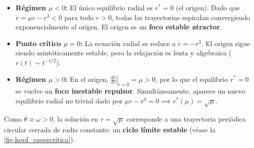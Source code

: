 \begin{itemize}
    \item \textbf{Régimen $\mu < 0$:} El único equilibrio radial es $r^* = 0$ (el origen). Dado que $\dot{r} = \mu r - r^3 < 0$ para todo $r > 0$, todas las trayectorias espiralan convergiendo exponencialmente al origen. El origen es un \textbf{foco estable atractor}.
    
    \item \textbf{Punto crítico $\mu = 0$:} La ecuación radial se reduce a $\dot{r} = -r^3$. El origen sigue siendo asintóticamente estable, pero la relajación es lenta y algebraica ($r(t) \sim t^{-1/2}$).
    
    \item \textbf{Régimen $\mu > 0$:} En el origen, $\left.\frac{d\dot{r}}{dr}\right|_{r=0} = \mu > 0$, por lo que el equilibrio $r^* = 0$ se vuelve un \textbf{foco inestable repulsor}. Simultáneamente, aparece un nuevo equilibrio radial no trivial dado por $\mu r - r^3 = 0 \implies r^*(\mu) = \sqrt{\mu}$.
\end{itemize}

Como $\dot{\theta} \approx \omega > 0$, la solución en $r = \sqrt{\mu}$ corresponde a una trayectoria periódica circular cerrada de radio constante: un \textbf{ciclo límite estable} (véase la \cref{fig:hopf_supercritica}).

